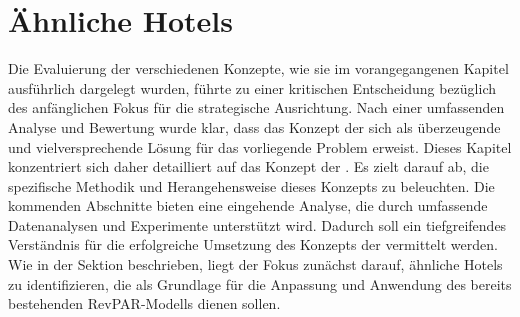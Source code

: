 \chapter{Ähnliche Hotels}
\label{chap:Similar_hotels}
Die Evaluierung der verschiedenen Konzepte, wie sie im vorangegangenen Kapitel \emph{} ausführlich dargelegt wurden, führte zu einer kritischen Entscheidung bezüglich des anfänglichen Fokus für die strategische Ausrichtung. Nach einer umfassenden Analyse und Bewertung wurde klar, dass das Konzept der \emph{} sich als überzeugende und vielversprechende Lösung für das vorliegende Problem erweist.
\newline
\newline
Dieses Kapitel konzentriert sich daher detailliert auf das Konzept der \emph{}. Es zielt darauf ab, die spezifische Methodik und Herangehensweise dieses Konzepts zu beleuchten. Die kommenden Abschnitte bieten eine eingehende Analyse, die durch umfassende Datenanalysen und Experimente unterstützt wird. Dadurch soll ein tiefgreifendes Verständnis für die erfolgreiche Umsetzung des Konzepts der \emph{} vermittelt werden.
\newline
\newline
Wie in der Sektion \emph{} beschrieben, liegt der Fokus zunächst darauf, ähnliche Hotels zu identifizieren, die als Grundlage für die Anpassung und Anwendung des bereits bestehenden RevPAR-Modells dienen sollen.


